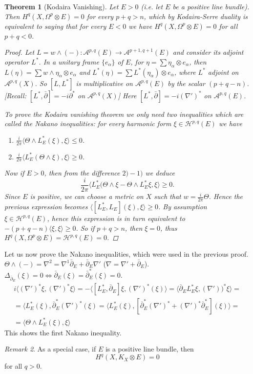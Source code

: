 \documentclass[11pt,A4]{article}
\theoremstyle{plain}
\newtheorem{thm}{Theorem}[section]
\theoremstyle{definition}
\theoremstyle{remark}
\newtheorem{rem}[thm]{Remark}
\newcommand{\1}{\mathbbm{1}}
\newcommand{\A}{\mathscr{A}}
\renewcommand{\H}{\mathcal{H}}
\newcommand{\ot}{\otimes}
\begin{document}
\begin{thm}[Kodaira Vanishing]
    Let $E>0$ (i.e. let $E$ be a positive line bundle).
    Then $H^{q}(X,\Omega^{p}\ot E)=0$ for every $p+q>n$, which by Kodaira-Serre duality is equivalent to saying that for every $E<0$ we have $H^{q}(X,\Omega^{p}\ot E)=0$ for all $p+q<0$.
    \begin{proof}
	Let $L=w\wedge (-)\colon \A^{p,q}(E)\to \A^{p+1,q+1}(E)$ and consider its adjoint operator $L^{*}$.
	In a unitary frame $\{e_{\alpha}\}$ of $E$, for $\eta=\sum \eta_{\alpha}\ot e_{\alpha}$, then $L(\eta)=\sum w\wedge \eta_{\alpha}\ot e_{\alpha}$ and $L^{*}(\eta)=\sum L^{*}(\eta_{\alpha})\ot e_{\alpha}$, where $L^{*}$ adjoint on $\A^{p,q}(X)$.
	So $[L,L^{*}]$ is multiplicative on $\A^{p,q}(E)$ by the scalar $(p+q-n)$.
	[Recall: $[L^{*},\bar{\partial}]=-i\partial^{*}$ on $\A^{p,q}(X)$]
	Here $[L^{*},\bar{\partial}]=-i(\nabla')^{*}$ on $\A^{p,q}(E)$.

	To prove the Kodaira vanishing theorem we only need two inequalities which are called the \textit{Nakano inequalities}: for every harmonic form $\xi \in \H^{p,q}(E)$ we have
	\begin{enumerate}[label=\arabic*)]
	    \item $\frac{i}{2\pi} \langle \Theta \wedge L_{E}^{*}(\xi), \xi\rangle \leqslant 0$.
	    \item $\frac{i}{2\pi} \langle L_{E}^{*}(\Theta \wedge \xi),\xi\rangle \geqslant 0$.
	\end{enumerate}

	Now if $E>0$, then from the difference $2)-1)$ we deduce
	\[ \frac{i}{2\pi}\langle L_{E}^{*}(\Theta \wedge \xi -\Theta \wedge L_{E}^{*}\xi ,\xi\rangle \geqslant 0 .\]
	Since $E$ is positive, we can choose a metric on $X$ such that $w=\frac{i}{2\pi}\Theta$.
	Hence the previous expression becomes $\langle [L_{E}^{*},L_{E}](\xi),\xi\rangle \geqslant 0$.
	By assumption $\xi\in \H^{p,q}(E)$, hence this expression is in turn equivalent to $-(p+q-n)\langle \xi ,\xi\rangle \geqslant 0 $.
	So if $p+q>n$, then $\xi=0$, thus $H^{q}(X,\Omega^{p}\ot E)=\H^{p,q}(E)=0$.
    \end{proof}
\end{thm}

Let us now prove the Nakano inequalities, which were used in the previous proof.
$\Theta \wedge (-)=\nabla^{2}=\nabla^{1}\bar{\partial}_{E}+\bar{\partial}_{E}\nabla'$ ($\nabla=\nabla'+\bar{\partial}_{E}$).
$\Delta_{\bar{\partial}_{E}}(\xi)=0 \Leftrightarrow \bar{\partial }_{E}(\xi)=\bar{\partial}_{E}^{*}(\xi)=0$.
\begin{multline*}
    i\langle (\nabla')^{*}\xi,(\nabla')^{*}\xi\rangle=-\langle [L_{E}^{*},\bar{\partial}_{E}]\xi,(\nabla')^{*}(\xi)\rangle = \langle \bar{\partial}_{E} L_{E}^{*}\xi,(\nabla'))^{*}\xi\rangle =\\
    =\langle L_{E}^{*}(\xi),\bar{\partial}_{E}^{*}(\nabla')^{*}(\xi)=\langle L_{E}^{*}(\xi),[\bar{\partial}_{E}^{*}(\nabla')^{*}+(\nabla')^{*}\bar{\partial}_{E}^{*}](\xi)\rangle = \\
    =\langle \Theta \wedge L_{E}^{*}(\xi),\xi\rangle 
\end{multline*}
This shows the first Nakano inequality.

\begin{rem}
    As a special case, if $E$ is a positive line bundle, then
    \[H^{q}(X,K_{X}\ot E)=0\]
    for all $q>0$.
\end{rem}



\end{document}
